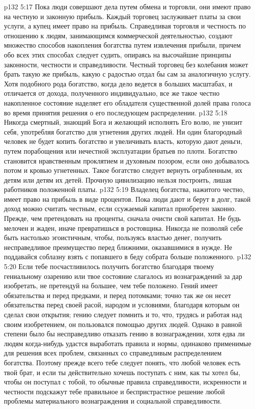 \vs p132 5:17 \pc {}\bibnobreakspace Пока люди совершают дела путем обмена и торговли, они имеют право на честную и законную прибыль. Каждый торговец заслуживает платы за свои услуги, а купец имеет право на прибыль. Справедливая торговля и честность по отношению к людям, занимающимся коммерческой деятельностью, создают множество способов накопления богатства путем извлечения прибыли, причем обо всех этих способах следует судить, опираясь на высочайшие принципы законности, честности и справедливости. Честный торговец без колебания может брать такую же прибыль, какую с радостью отдал бы сам за аналогичную услугу. Хотя подобного рода богатство, когда дело ведется в больших масштабах, и отличается от дохода, полученного индивидуально, все же такое честно накопленное состояние наделяет его обладателя существенной долей права голоса во время принятия решения о его последующем распределении.
\vs p132 5:18 \pc {}\bibnobreakspace Никогда смертный, знающий Бога и желающий исполнять Его волю, не унизит себя, употребляя богатство для угнетения других людей. Ни один благородный человек не будет копить богатство и увеличивать власть, которую дают деньги, путем порабощения или нечестной эксплуатации братьев по плоти. Богатство становится нравственным проклятием и духовным позором, если оно добывалось потом и кровью угнетенных. Такое богатство следует вернуть ограбленным, их детям или детям их детей. Прочную цивилизацию нельзя построить, лишая работников положенной платы.
\vs p132 5:19 \pc {}\bibnobreakspace Владелец богатства, нажитого честно, имеет право на прибыль в виде процентов. Пока люди дают и берут в долг, такой доход можно считать честным, если ссужаемый капитал приобретен законно. Прежде, чем претендовать на проценты, сначала очисти свой капитал. Не будь мелочен и жаден, иначе превратишься в ростовщика. Никогда не позволяй себе быть настолько эгоистичным, чтобы, пользуясь властью денег, получить несправедливое преимущество перед ближними, оказавшимися в нужде. Не поддавайся соблазну взять с попавшего в беду собрата больше положенного.
\vs p132 5:20 \pc {}\bibnobreakspace Если тебе посчастливилось получить богатство благодаря твоему гениальному озарению или твое состояние слагалось из вознаграждений за дар изобретать, не претендуй на большее, чем тебе положено. Гений имеет обязательства и перед предками, и перед потомками; точно так же он несет обязательства перед своей расой, народом и условиями, благодаря которым он сделал свои открытия; гению следует помнить и то, что, трудясь и работая над своим изобретением, он пользовался помощью других людей. Однако в равной степени было бы несправедливо отказать гению в вознаграждении, хотя едва ли людям когда\hyp{}нибудь удастся выработать правила и нормы, одинаково применимые для решения всех проблем, связанных со справедливым распределением богатства. Поэтому прежде всего тебе следует понять, что любой человек есть твой брат, и если ты действительно хочешь поступать с ним, как ты хотел бы, чтобы он поступал с тобой, то обычные правила справедливости, искренности и честности подскажут тебе правильное и беспристрастное решение любой проблемы материального вознаграждения и социальной справедливости.
